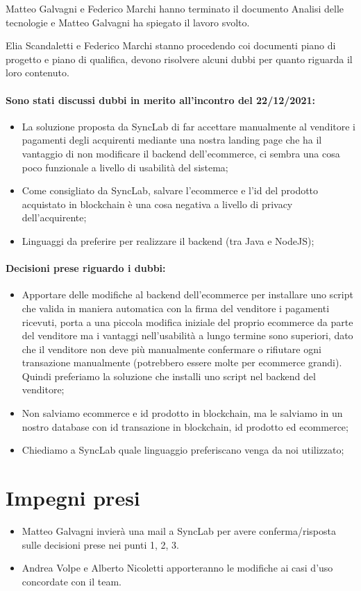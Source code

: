 \documentclass[a4paper, 12pt]{article}
\begin{document}
Matteo Galvagni e Federico Marchi hanno terminato il documento Analisi delle tecnologie e Matteo Galvagni ha spiegato 
il lavoro svolto.

Elia Scandaletti e Federico Marchi stanno procedendo coi documenti piano di progetto e piano di qualifica, devono risolvere
alcuni dubbi per quanto riguarda il loro contenuto.

\paragraph{Sono stati discussi dubbi in merito all'incontro del 22/12/2021:}
\begin{itemize}
\item La soluzione proposta da SyncLab di far accettare manualmente al venditore i pagamenti degli acquirenti mediante 
una nostra landing page che ha il vantaggio di non modificare il backend dell'ecommerce, ci sembra una cosa poco funzionale
a livello di usabilità del sistema;
\item Come consigliato da SyncLab, salvare l'ecommerce e l'id del prodotto acquistato in blockchain è una cosa negativa a livello
di privacy dell'acquirente;
\item Linguaggi da preferire per realizzare il backend (tra Java e NodeJS);
\end{itemize}

\paragraph{Decisioni prese riguardo i dubbi:}
\begin{itemize}
\item Apportare delle modifiche al backend dell'ecommerce per installare uno script che valida in maniera automatica con la firma
del venditore i pagamenti ricevuti, porta a una piccola modifica iniziale del proprio ecommerce da parte del venditore
ma i vantaggi nell'usabilità a lungo termine sono superiori, dato che il venditore non deve più manualmente confermare o rifiutare
ogni transazione manualmente (potrebbero essere molte per ecommerce grandi). Quindi preferiamo la soluzione che installi uno 
script nel backend del venditore;
\item Non salviamo ecommerce e id prodotto in blockchain, ma le salviamo in un nostro database con id transazione in blockchain, id 
prodotto ed ecommerce;
\item Chiediamo a SyncLab quale linguaggio preferiscano venga da noi utilizzato;
\end{itemize}

\section{Impegni presi}
\begin{itemize}
\item Matteo Galvagni invierà una mail a SyncLab per avere conferma/risposta sulle decisioni prese nei punti 1, 2, 3.
\item Andrea Volpe e Alberto Nicoletti apporteranno le modifiche ai casi d'uso concordate con il team.
\end{itemize}
\end{document}
